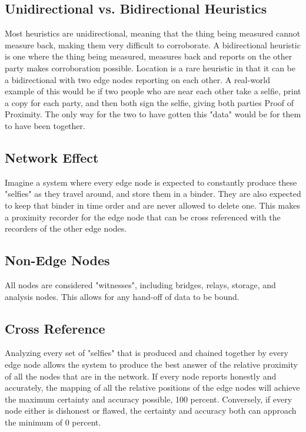 \documentclass{article}
\begin{document}
\subsection {Unidirectional vs. Bidirectional Heuristics}
Most heuristics are unidirectional, meaning that the thing being measured cannot measure back, making them very difficult to corroborate.  A bidirectional heuristic is one where the thing being measured, measures back and reports on the other party makes corroboration possible.  Location is a rare heuristic in that it can be a bidirectional with two edge nodes reporting on each other.
A real-world example of this would be if two people who are near each other take a selfie, print a copy for each party, and then both sign the selfie, giving both parties Proof of Proximity. The only way for the two to have gotten this "data" would be for them to have been together.

\subsection {Network Effect}
Imagine a system where every edge node is expected to constantly produce these "selfies" as they travel around, and store them in a binder. They are also expected to keep that binder in time order and are never allowed to delete one.  This makes a proximity recorder for the edge node that can be cross referenced with the recorders of the other edge nodes.

\subsection {Non-Edge Nodes}
All nodes are considered "witnesses", including bridges, relays, storage, and analysis nodes.  This allows for any hand-off of data to be bound.

\subsection {Cross Reference}
Analyzing every set of "selfies" that is produced and chained together by every edge node allows the system to produce the best answer of the relative proximity of all the nodes that are in the network.  If every node reports honestly and accurately, the mapping of all the relative positions of the edge nodes will achieve the maximum certainty and accuracy possible, 100 percent.  Conversely, if every node either is dishonest or flawed, the certainty and accuracy both can approach the minimum of 0 percent.
\end{document}
